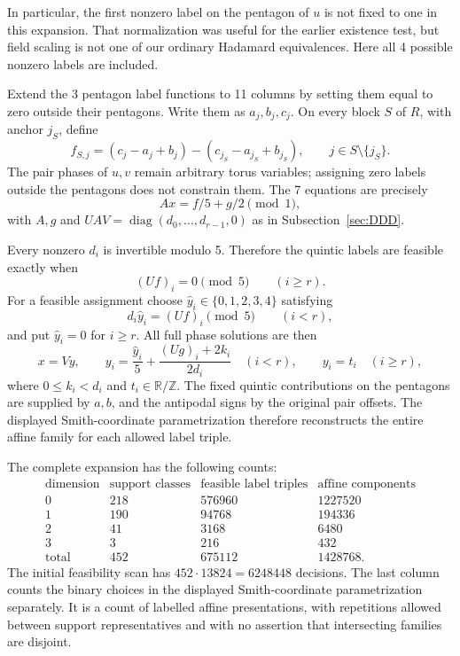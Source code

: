 \documentclass[11pt,a4paper]{article}
\theoremstyle{plain}
\theoremstyle{definition}
\theoremstyle{plain}
\begin{document}
In particular, the first nonzero label on the pentagon of $u$ is not fixed to one in this expansion. That normalization was useful for the earlier existence test, but field scaling is not one of our ordinary Hadamard equivalences. Here all 4 possible nonzero labels are included.

Extend the 3 pentagon label functions to 11 columns by setting them equal to zero outside their pentagons. Write them as $a_j,b_j,c_j$. On every block $S$ of $R$, with anchor $j_S$, define
\[
f_{S,j}=(c_j-a_j+b_j)-(c_{j_S}-a_{j_S}+b_{j_S}),
\qquad j\in S\setminus\{j_S\}.
\]
The pair phases of $u,v$ remain arbitrary torus variables; assigning zero labels outside the pentagons does not constrain them. The 7 equations are precisely
$$Ax=f/5+g/2\pmod1,$$
with $A,g$ and $UAV=\operatorname{diag}(d_0,\ldots,d_{r-1},0)$ as in Subsection~\ref{sec:DDD}.

Every nonzero $d_i$ is invertible modulo 5. Therefore the quintic labels are feasible exactly when
\[
(Uf)_i=0\pmod5\qquad(i\geq r).
\]
For a feasible assignment choose $\widehat y_i\in\{0,1,2,3,4\}$ satisfying
$$d_i\widehat y_i=(Uf)_i\pmod5\qquad(i<r),$$
and put $\widehat y_i=0$ for $i\geq r$. All full phase solutions are then
\[
x=V y,\qquad
y_i=\frac{\widehat y_i}{5}+\frac{(Ug)_i+2k_i}{2d_i}\quad(i<r),
\qquad y_i=t_i\quad(i\geq r),
\]
where $0\leq k_i<d_i$ and $t_i\in\mathbb R/\mathbb Z$. The fixed quintic contributions on the pentagons are supplied by $a,b$, and the antipodal signs by the original pair offsets. The displayed Smith-coordinate parametrization therefore reconstructs the entire affine family for each allowed label triple.

The complete expansion has the following counts:
\[
\begin{array}{c|r|r|r}
\text{dimension}&\text{support classes}&\text{feasible label triples}&\text{affine components}\\\hline
0&218&576960&1227520\\
1&190&94768&194336\\
2&41&3168&6480\\
3&3&216&432\\\hline
\text{total}&452&675112&1428768.
\end{array}
\]
The initial feasibility scan has $452\cdot13824=6248448$ decisions. The last column counts the binary choices in the displayed Smith-coordinate parametrization separately. It is a count of labelled affine presentations, with repetitions allowed between support representatives and with no assertion that intersecting families are disjoint.
\end{document}
